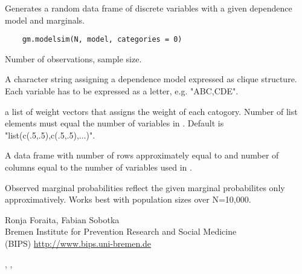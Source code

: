 \begin{Description}\relax
Generates a random data frame of discrete variables with a given dependence model and marginals.
\end{Description}
\begin{Usage}
\begin{verbatim}
    gm.modelsim(N, model, categories = 0)
\end{verbatim}
\end{Usage}
\begin{Arguments}
\begin{ldescription}
\item[\code{N}] Number of observations, sample size. 
\item[\code{model}] A character string assigning a dependence model expressed as clique structure. Each variable
has to be expressed as a letter, e.g. "ABC,CDE".

\item[\code{categories}] a list of weight vectors that assigns the weight of each catogory.
Number of list elements must equal the number of variables in .
Default is "list(c(.5,.5),c(.5,.5),...)".

\end{ldescription}
\end{Arguments}
\begin{Value}
A data frame with number of rows approximately equal to  and number of columns equal
to the number of variables used in .
\end{Value}
\begin{Note}\relax
Observed marginal probabilities reflect the given marginal probabilites only approximatively.
Works best with population sizes over N=10,000.
\end{Note}
\begin{Author}\relax
Ronja Foraita, Fabian Sobotka \\
Bremen Institute for Prevention Research and Social Medicine \\
(BIPS)  \url{http://www.bips.uni-bremen.de}
\end{Author}
\begin{SeeAlso}\relax
{}, , 
\end{SeeAlso}
